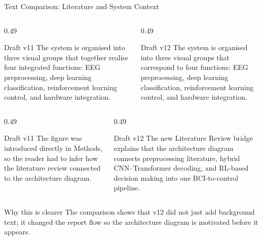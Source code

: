 \documentclass[UTF8,aspectratio=169,11pt]{ctexbeamer}
\begin{document}
\begin{frame}[t]{Text Comparison: Literature and System Context}
\scriptsize

    \begin{columns}[T,onlytextwidth]
        \begin{column}{0.49\textwidth}
            \begin{alertblock}{Draft v11}
                The system is organised into three visual groups that together realise four integrated functions: EEG preprocessing, deep learning classification, reinforcement learning control, and hardware integration.
            \end{alertblock}
        \end{column}
        \begin{column}{0.49\textwidth}
            \begin{block}{Draft v12}
                The system is organised into three visual groups that correspond to four functions: EEG preprocessing, deep learning classification, reinforcement learning control, and hardware integration.
            \end{block}
        \end{column}
    \end{columns}

    \vspace{0.5em}

    \begin{columns}[T,onlytextwidth]
        \begin{column}{0.49\textwidth}
            \begin{alertblock}{Draft v11}
                The figure was introduced directly in Methods, so the reader had to infer how the literature review connected to the architecture diagram.
            \end{alertblock}
        \end{column}
        \begin{column}{0.49\textwidth}
            \begin{block}{Draft v12}
                The new Literature Review bridge explains that the architecture diagram connects preprocessing literature, hybrid CNN--Transformer decoding, and RL-based decision making into one BCI-to-control pipeline.
            \end{block}
        \end{column}
    \end{columns}

    \vfill

    \begin{block}{Why this is clearer}
        The comparison shows that v12 did not just add background text; it changed the report flow so the architecture diagram is motivated before it appears.
    \end{block}

\end{frame}
\end{document}
